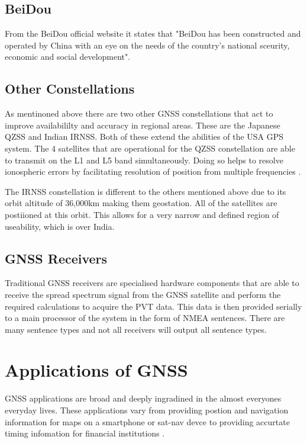 \subsection{BeiDou} \label{subsec:GNSS_BeiDouIntro}
From the BeiDou official website it states that "BeiDou has been constructed and operated by China with an eye on the needs of the country's national sceurity, economic
and social development".

\subsection{Other Constellations} \label{subsec:GNSS_OtherIntro}
As mentinoned above there are two other GNSS constellations that act to improve availabililty and accuracy in regional areas. These are the Japanese QZSS and Indian
IRNSS. Both of these extend the abilities of the USA GPS system. The 4 satellites that are operational for the QZSS constellation are able to transmit on the L1 and L5
band  simultaneously. Doing so helps to resolve ionospheric errors by facilitating resolution of position from multiple frequencies \cite{RN48}.

The IRNSS constellation is different to the others mentioned above due to its orbit altitude of 36,000km making them geostation. All of the satellites are postiioned at
this orbit. This allows for a very narrow and defined region of useability, which is over India. 

\subsection{GNSS Receivers}
Traditional GNSS receivers are specialised hardware components that are able to receive the spread spectrum signal from the GNSS satellite and perform the required
calculations to acquire the PVT data. This data is then provided serially to a main processor of the system in the form of NMEA sentences. There are many sentence types
and not all receivers will output all sentence types. 


\section{Applications of GNSS} \label{sec:ApplicationsGNSS}
GNSS applications are broad and deeply ingradined in the almost everyones everyday lives. These applications vary from providing postion and navigation information for
maps on a smartphone or sat-nav devce to providing accurtate timing infomation for financial institutions \cite{RN33}.

